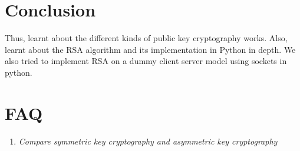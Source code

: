 \documentclass[openany]{book}
\begin{document}
\section{Conclusion}
Thus, learnt about the different kinds of public key cryptography works. Also, learnt about the RSA algorithm and its implementation in Python in depth. We also tried to implement RSA on a dummy client server model using sockets in python.
\clearpage

\section{FAQ}

\begin{enumerate}
	\item \textit{Compare symmetric key cryptography and asymmetric key cryptography}\\
	

\end{enumerate}
\end{document}
